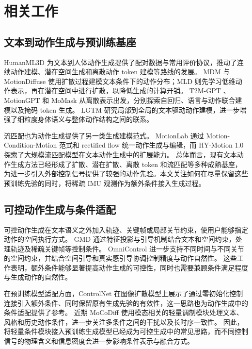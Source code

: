 \section{相关工作}
\label{sec:2_relatedworks}

\subsection{文本到动作生成与预训练基座}

HumanML3D \cite{guo2022humanml3d} 为文本到人体动作生成提供了配对数据与常用评价协议，推动了连续动作建模、潜在空间生成和离散动作 token 建模等路线的发展。
MDM \cite{tevet2023mdm} 与 MotionDiffuse \cite{zhang2024motiondiffuse} 使用扩散过程建模文本条件下的动作分布；MLD \cite{chen2023mld} 则先学习低维动作表示，再在潜在空间中进行扩散，以降低生成的计算开销。
T2M-GPT \cite{zhang2023t2mgpt}、MotionGPT \cite{jiang2023motiongpt} 和 MoMask \cite{guo2024momask} 从离散表示出发，分别探索自回归、语言与动作联合建模以及掩码 token 生成。
LGTM \cite{sun2024lgtm} 研究局部到全局的文本驱动动作建模，进一步增强了细粒度身体语义与整体动作结构之间的联系。

流匹配也为动作生成提供了另一类生成建模范式。
MotionLab \cite{guo2025motionlab} 通过 Motion-Condition-Motion 范式和 rectified flow 统一动作生成与编辑，而 HY-Motion 1.0 \cite{tencent2025hymotion} 探索了大规模流匹配模型在文本动作生成中的扩展能力。
总体而言，现有文本动作生成方法已经形成了扩散、潜在扩散、离散 token 和流匹配等多种成熟基座，为进一步引入外部控制信号提供了较强的动作先验。本文关注如何在尽量保留这些预训练先验的同时，将稀疏 IMU 观测作为额外条件接入生成过程。

\subsection{可控动作生成与条件适配}

可控动作生成在文本语义之外加入轨迹、关键帧或局部关节约束，使用户能够指定动作的空间执行方式。
GMD \cite{karunratanakul2023gmd} 通过特征投影与引导机制结合文本和空间约束，处理轨迹及稀疏关键帧等控制条件。
OmniControl \cite{xie2023omnicontrol} 进一步支持不同时间与不同关节的空间约束，并结合空间引导和真实感引导协调控制精度与动作自然性。
这些工作表明，额外条件能够显著提高动作生成的可控性，同时也需要兼顾条件满足程度与生成动作的自然性。

在预训练模型适配方面，ControlNet \cite{zhang2023controlnet} 在图像扩散模型上展示了通过零初始化控制连接引入额外条件、同时保留原有生成先验的有效性，这一思路也为动作生成中的条件适配提供了参考。
近期 MoCoDiff \cite{song2026mocodiff} 使用模态相关的轻量调制模块处理文本、风格和历史动作条件，进一步关注多条件之间的干扰以及长时序一致性。
因此，将轻量条件模块接入预训练生成模型已经成为可控生成中的常见思路，而不同控制信号的物理含义和信息密度会进一步影响条件表示与融合方式。

